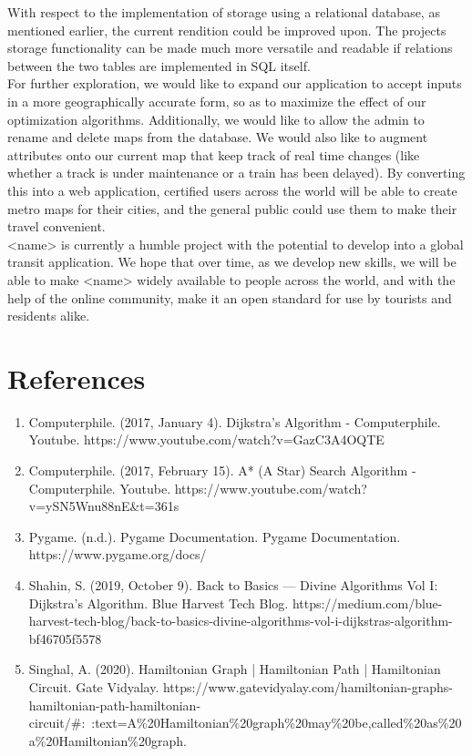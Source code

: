 \documentclass[fontsize=11pt]{article}
\begin{document}
With  respect to the implementation of storage using a relational database, as mentioned earlier, the current rendition could be improved upon. The projects storage functionality can be made much more versatile and readable if relations between the two tables are implemented in SQL itself. \\

For further exploration, we would like to expand our application to accept inputs in a more geographically accurate form, so as to maximize the effect of our optimization algorithms. Additionally, we would like to allow the admin to rename and delete maps from the database. We would also like to augment attributes onto our current map that keep track of real time changes (like whether a track is under maintenance or a train has been delayed). By converting this into a web application, certified users across the world will be able to create metro maps for their cities, and the general public could use them to make their travel convenient. \\

<name> is currently a humble project with the potential to develop into a global transit application. We hope that over time, as we develop new skills, we will be able to make <name> widely available to people across the world, and with the help of the online community, make it an open standard for use by tourists and residents alike.
    \section*{References}
    \begin{enumerate}
        \item Computerphile. (2017, January 4). Dijkstra's Algorithm - Computerphile. Youtube. https://www.youtube.com/watch?v=GazC3A4OQTE
        \item Computerphile. (2017, February 15). A* (A Star) Search Algorithm - Computerphile. Youtube. https://www.youtube.com/watch?v=ySN5Wnu88nE\&t=361s
        \item Pygame. (n.d.). Pygame Documentation. Pygame Documentation. https://www.pygame.org/docs/
        \item Shahin, S. (2019, October 9). Back to Basics — Divine Algorithms Vol I: Dijkstra’s Algorithm. Blue Harvest Tech Blog. https://medium.com/blue-harvest-tech-blog/back-to-basics-divine-algorithms-vol-i-dijkstras-algorithm-bf46705f5578
        \item Singhal, A. (2020). Hamiltonian Graph | Hamiltonian Path | Hamiltonian Circuit. Gate Vidyalay. https://www.gatevidyalay.com/hamiltonian-graphs-hamiltonian-path-hamiltonian-circuit/\#:~:text=A\%20Hamiltonian\%20graph\%20may\%20be,called\%20as\%20a\%20Hamiltonian\%20graph.

    \end{enumerate}


\end{document}
